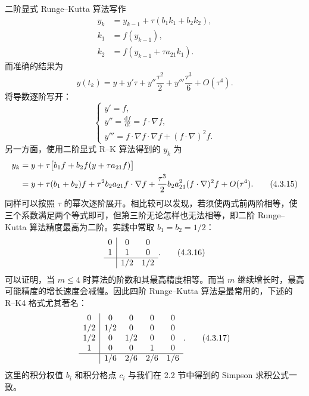 二阶显式 Runge--Kutta 算法写作
\begin{align}
 y_k&=y_{k-1}+\tau(b_1k_1+b_2k_2),\tag{4.3.10}\\
 k_1&=f(y_{k-1}),\tag{4.3.11}\\
 k_2&=f(y_{k-1}+\tau a_{21}k_1).\tag{4.3.12}
\end{align}
而准确的结果为
\begin{equation}
 y(t_k)=y+y'\tau+y''\frac{\tau^2}{2}+y'''\frac{\tau^3}{6}+O(\tau^4).
\tag{4.3.13}
\end{equation}
将导数逐阶写开：
\begin{equation}
\begin{cases}
 y'=f,\\
 \displaystyle y''=\frac{\mathrm df}{\mathrm dt}=f\cdot\nabla f,\\
 y'''=f\cdot\nabla f\cdot\nabla f+(f\cdot\nabla)^2f.
\end{cases}
\tag{4.3.14}
\end{equation}
另一方面，使用二阶显式 R--K 算法得到的 $y_k$ 为
\begin{align}
 y_k
 &=y+\tau\bigl[b_1f+b_2f(y+\tau a_{21}f)\bigr]\notag\\
 &=y+\tau(b_1+b_2)f+\tau^2b_2a_{21}f\cdot\nabla f
 +\frac{\tau^3}{2}b_2a_{21}^2(f\cdot\nabla)^2f+O(\tau^4).
\tag{4.3.15}
\end{align}
同样可以按照 $\tau$ 的幂次逐阶展开。相比较可以发现，若须使两式前两阶相等，使三个系数满足两个等式即可，但第三阶无论怎样也无法相等，即二阶 Runge--Kutta 算法精度最高为二阶。实践中常取 $b_1=b_2=1/2$：
\begin{equation}
\begin{array}{c|cc}
0&0&0\\
1&1&0\\ \hline
&1/2&1/2
\end{array}.
\tag{4.3.16}
\end{equation}
可以证明，当 $m\le 4$ 时算法的阶数和其最高精度相等。而当 $m$ 继续增长时，最高可能精度的增长速度会减慢。因此四阶 Runge--Kutta 算法是最常用的，下述的 R--K4 格式尤其著名：
\begin{equation}
\begin{array}{c|cccc}
0&0&0&0&0\\
1/2&1/2&0&0&0\\
1/2&0&1/2&0&0\\
1&0&0&1&0\\ \hline
&1/6&2/6&2/6&1/6
\end{array}.
\tag{4.3.17}
\end{equation}
这里的积分权值 $b_i$ 和积分格点 $c_i$ 与我们在 2.2 节中得到的 Simpson 求积公式一致。

